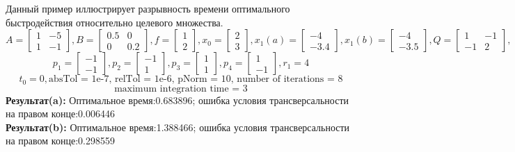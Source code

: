 \documentclass[10pt]{article}
\begin{document}
Данный пример иллюстрирует разрывность времени оптимального быстродействия относительно целевого множества. 
 \[ A = \begin{bmatrix}
      		1 & -5 \\[0.3em]
      		1 & -1
      	  \end{bmatrix} , 
 B = \begin{bmatrix}
      	   0.5 & 0 \\[0.3em]
      	   0 & 0.2
      \end{bmatrix} ,
 f = \begin{bmatrix}
       	    1 \\[0.3em]
      	    2
      \end{bmatrix} ,
 x_0 = \begin{bmatrix}
      	    2 \\[0.3em]
      	    3
      \end{bmatrix} ,
 x_1(a) = \begin{bmatrix}
      	-4 \\[0.3em]
      	-3.4
      \end{bmatrix} ,
x_1(b) = \begin{bmatrix}
      	-4 \\[0.3em]
      	-3.5
      \end{bmatrix} ,
 Q = \begin{bmatrix}
      	   1 & -1 \\[0.3em]
      	   -1 & 2
      \end{bmatrix}, \]
\[ p_1 = \begin{bmatrix}
      	-1 \\[0.3em]
      	-1
      \end{bmatrix} ,
p_2 = \begin{bmatrix}
      	-1 \\[0.3em]
      	1
      \end{bmatrix} ,
p_3 = \begin{bmatrix}
      	1 \\[0.3em]
      	1
      \end{bmatrix} ,
p_4 = \begin{bmatrix}
      	1 \\[0.3em]
      	-1
      \end{bmatrix}, r_1 = 4 \]
\[ t_0 = 0, \text{absTol = 1e-7, relTol = 1e-6, pNorm = 10, number of iterations = 8}\]  
\[\text{maximum integration time = 3} \]
\textbf{Результат(a):} Оптимальное время:0.683896; ошибка условия трансверсальности на правом конце:0.006446 \\
\textbf{Результат(b):} Оптимальное время:1.388466; ошибка условия трансверсальности на правом конце:0.298559 
\end{document}
